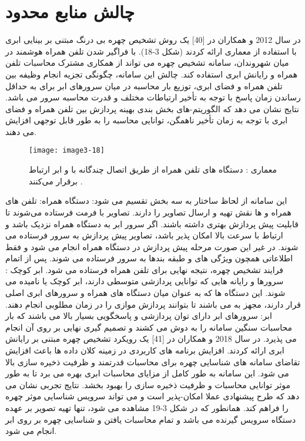 \section{چالش منابع محدود}
در سال 2012  و همکاران در [40] یک روش تشخیص چهره بی درنگ مبتنی بر بینایی ابری  با استفاده از معماری  ارائه کردند (شکل 3-18). با فراگیر شدن تلفن همراه هوشمند در میان شهروندان، سامانه تشخیص چهره می تواند از همکاری مشترک محاسبات تلفن همراه و رایانش ابری استفاده کند. چالش این سامانه، چگونگی تجزیه انجام وظیفه بین تلفن همراه و فضای ابری، توزیع بار محاسبه در میان سرورهای ابر برای به حداقل رساندن زمان پاسخ با توجه به تأخیر ارتباطات مختلف و قدرت محاسبه سرور می باشد. نتایج نشان می دهد که الگوریتم-های بخش بندی بهینه پردازش بین تلفن همراه و فضای ابری با توجه به زمان تأخیر ناهمگن، توانایی محاسبه را به طور قابل توجهی افزایش می دهند. 
 \begin{figure}[h]
\centering
  \texttt{[image: image3-18]}
  \caption{معماری : دستگاه های تلفن همراه از طریق اتصال چندگانه با  و ابر ارتباط برقرار می‌کنند \cite{ref1}.}
  \label{image2-1}
\end{figure}
\noindent
این سامانه از لحاظ ساختار به سه بخش تقسیم می شود:
\noindent
دستگاه همراه: تلفن های همراه و  ها نقش تهیه و ارسال تصاویر را دارند. تصاویر با فرمت  فرستاده می‌شوند تا قابلیت پیش پردازش بهتری داشته باشند. اگر سرور ابر به دستگاه همراه نزدیک باشد و ارتباط با سرعت بالا امکان پذیر باشد، تصاویر پیش پردازش به سرور فرستاده می شوند. در غیر این صورت مرحله پیش پردازش در دستگاه همراه انجام می شود و فقط اطلاعاتی همچون ویژگی های  و طبقه بندها به سرور فرستاده می شوند. پس از اتمام فرایند تشخیص چهره، نتیجه نهایی برای تلفن همراه فرستاده می شود.
\noindent
ابر کوچک : سرورها و رایانه هایی که توانایی پردازشی متوسطی دارند، ابر کوچک یا  نامیده می شوند. این دستگاه ها که به عنوان میان دستگاه های همراه و سرورهای ابری اصلی قرار دارند، مجهز به  می باشند تا بتوانند پردازش موازی را در زمان مطلوبی انجام دهند.
ابر: سرورهای ابر دارای توان پردازشی و پاسخگویی بسیار بالا می باشند که بار محاسبات سنگین سامانه را به دوش می کشند و تصمیم گیری نهایی بر روی آن انجام می پذیرد.
\noindent
در سال 2018  و همکاران در [41] یک رویکرد تشخیص چهره مبتنی بر رایانش ابری ارائه کردند. افزایش برنامه های کاربردی در زمینه کلان داده  ها باعث افزایش تقاضای سامانه های شناسایی چهره برای محاسبات قدرتمند و ظرفیت ذخیره سازی بالا می شود. این سامانه به طور کامل از مزایای محاسبات ابری بهره می برد تا به طور موثر توانایی محاسبات و ظرفیت ذخیره سازی را بهبود بخشد. نتایج تجربی نشان می دهد که طرح پیشنهادی عملا امکان-پذیر است و می تواند سرویس شناسایی موثر چهره را فراهم کند. همانطور که در شکل 3-19 مشاهده می شود، تنها تهیه تصویر بر عهده دستگاه سرویس گیرنده می باشد و تمام محاسبات یافتن و شناسایی چهره بر روی ابر انجام می شود.
